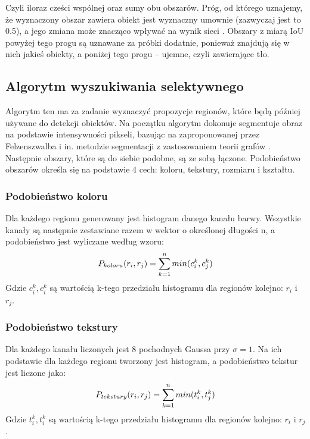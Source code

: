 \documentclass[a4paper,twoside,12pt]{book}
\begin{document}
{{Czyli iloraz cześci wspólnej oraz sumy obu obszarów. Próg, od którego uznajemy, że wyznaczony obszar zawiera obiekt jest wyznaczny umownie (zazwyczaj jest to 0.5), a jego zmiana może znacząco wpływać na wynik sieci \cite{girshick2014rich}. Obszary z miarą IoU powyżej tego progu są uznawane za próbki dodatnie, ponieważ znajdują się w nich jakieś obiekty, a poniżej tego progu – ujemne, czyli zawierające tło.}

\subsection{Algorytm wyszukiwania selektywnego}
\label{ss}
{Algorytm ten\cite{uijlings2013selective} ma za zadanie wyznaczyć propozycje regionów, które będą później używane do detekcji obiektów. Na początku algorytm dokonuje segmentuje obraz na podstawie intensywności pikseli, bazując na zaproponowanej przez Felzenszwalba i in. metodzie segmentacji z zastosowaniem teorii grafów \cite{felzenszwalb2004efficient}. Następnie obszary, które są do siebie podobne, są ze sobą łączone. Podobieństwo obszarów określa się na podstawie 4 cech: koloru, tekstury, rozmiaru i kształtu.}
\subsubsection{Podobieństwo koloru}
{Dla każdego regionu generowany jest histogram danego kanału barwy. Wszystkie kanały są następnie zestawiane razem w wektor o określonej długości n, a podobieństwo jest wyliczane według wzoru:
\begin{equation}
P_{koloru}(r_{i},r_{j})= \sum_{k=1}^{n} min(c_{i}^k,c_{j}^k)\\
\end{equation}
Gdzie $c_{i}^k, c_{i}^k$ są wartością k-tego przedziału histogramu dla regionów kolejno: $r_{i}$ i $r_{j}$.
}
\subsubsection{Podobieństwo tekstury}
{
Dla każdego kanału liczonych jest 8 pochodnych Gaussa przy $\sigma=1$. Na ich podstawie dla każdego regionu tworzony jest histogram, a podobieństwo tekstur jest liczone jako:
\begin{equation}
P_{tekstury}(r_{i},r_{j})= \sum_{k=1}^{n} min(t_{i}^k,t_{j}^k)\\
\end{equation}
Gdzie $t_{i}^k,  t_{i}^k$ są wartością k-tego przedziału histogramu dla regionów kolejno: $r_{i}$ i $r_{j}$.

}}
\end{document}

